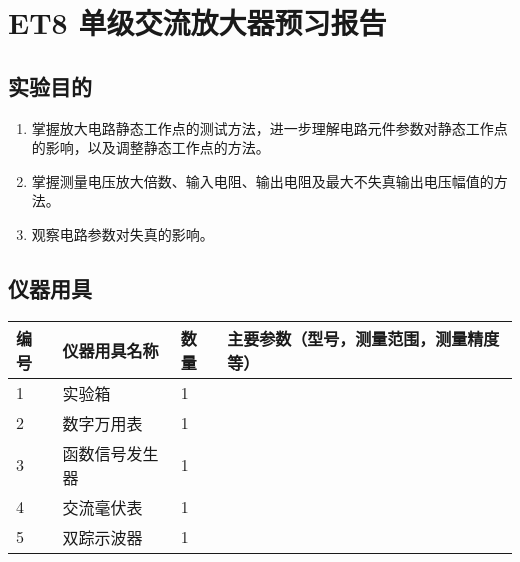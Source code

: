 \documentclass[dvipsnames, svgnames,a4paper,11pt]{article}
\begin{document}
	\clearpage
	\tableofcontents
	\clearpage
	
	
	
	
	\setcounter{section}{0}
	\section{ET8 单级交流放大器\quad\heiti 预习报告}
	
	\subsection{实验目的}
	\begin{enumerate}
		\item 掌握放大电路静态工作点的测试方法，进一步理解电路元件参数对静态工作点的影响，以及调整静态工作点的方法。
		\item 掌握测量电压放大倍数、输入电阻、输出电阻及最大不失真输出电压幅值的方法。
		\item 观察电路参数对失真的影响。
	\end{enumerate}
	
	\subsection{仪器用具}
	\begin{table}[htbp]
		\centering
		\renewcommand\arraystretch{1.6}
		\begin{tabular}{p{}|p{}|p{}|p{}}
			\hline
			编号 & 仪器用具名称 & 数量 & 主要参数（型号，测量范围，测量精度等） \\
			\hline
			1 & 实验箱 & 1 & \\
			\hline
			2 & 数字万用表 & 1 &  \\
			\hline
			3 & 函数信号发生器 & 1 & \\
			\hline
			4 & 交流毫伏表 & 1 &  \\
			\hline
			5 & 双踪示波器 & 1 & \\
			\hline
		\end{tabular}
	\end{table}
	

	
	
\end{document}
